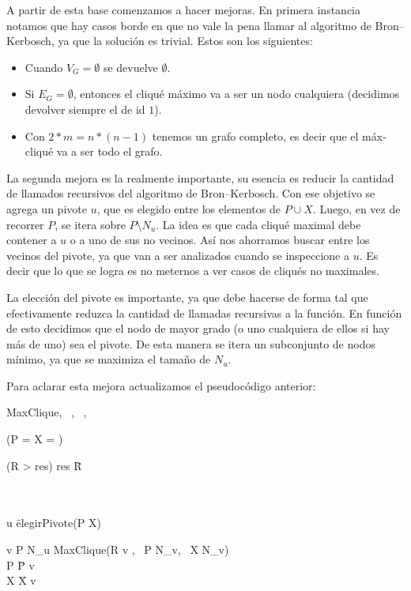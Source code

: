 A partir de esta base comenzamos a hacer mejoras. En primera instancia notamos que hay casos borde en que no vale la pena llamar al algoritmo de Bron–Kerbosch, ya que la solución es trivial. Estos son los siguientes:
\begin{itemize}
\item Cuando $V_{G} = \emptyset$ se devuelve $\emptyset$.
\item Si $E_{G} = \emptyset$, entonces el cliqué máximo va a ser un nodo cualquiera (decidimos devolver siempre el de id $1$).
\item Con $2 * m = n * (n-1)$ tenemos un grafo completo, es decir que el máx-cliqué va a ser todo el grafo.
\end{itemize}

La segunda mejora es la realmente importante, su esencia es reducir la cantidad de llamados recursivos del algoritmo de Bron–Kerbosch. Con ese objetivo se agrega un pivote $u$, que es elegido entre los elementos de $P \cup X$. Luego, en vez de recorrer $P$, se itera sobre $P \setminus N_{u}$. La idea es que cada cliqué maximal debe contener a $u$ o a uno de sus no vecinos. Así nos ahorramos buscar entre los vecinos del pivote, ya que van a ser analizados cuando se inspeccione a $u$. Es decir que lo que se logra es no meternos a ver casos de cliqués no maximales.

La elección del pivote es importante, ya que debe hacerse de forma tal que efectivamente reduzca la cantidad de llamadas recursivas a la función. En función de esto decidimos que el nodo de mayor grado (o uno cualquiera de ellos si hay más de uno) sea el pivote. De esta manera se itera un subconjunto de nodos mínimo, ya que se maximiza el tamaño de $N_{u}$.

Para aclarar esta mejora actualizamos el pseudocódigo anterior: \\

\begin{algorithm}{MaxClique}{, \, , \, , \, }{}
	\begin{IF}{(P = \emptyset \wedge X = \emptyset)}
		\begin{IF}{(\sharp R > \sharp res)}
    			res \= R
		\end{IF}
	\end{IF}\\
	\\
	u \= elegirPivote(P \cup X) \\
    \begin{FOR}{v \in P \setminus N_{u}}
    	MaxClique(R \cup \lbrace v \rbrace, \, P \cap N_{v}, \, X \cap N_{v}) \\
		P \= P \setminus \lbrace v \rbrace\\
		X \= X \cup \lbrace v \rbrace
	\end{FOR}
\end{algorithm}


